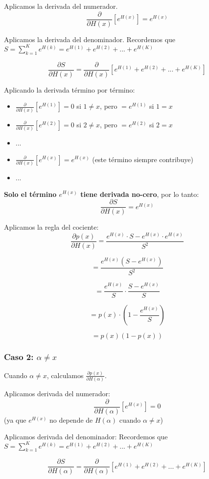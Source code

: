 \documentclass[12pt,a4paper]{article}
\begin{document}
Aplicamos la derivada del numerador.
$$\frac{\partial}{\partial H(x)}[e^{H(x)}] = e^{H(x)}$$

Aplicamos la derivada del denominador. Recordemos que $S = \sum_{k=1}^{K} e^{H(k)} = e^{H(1)} + e^{H(2)} + ... + e^{H(K)}$

$$\frac{\partial S}{\partial H(x)} = \frac{\partial}{\partial H(x)}\left[e^{H(1)} + e^{H(2)} + ... + e^{H(K)}\right]$$

Aplicando la derivada término por término:
\begin{itemize}
    \item $\frac{\partial}{\partial H(x)}[e^{H(1)}] = 0$ si $1 \neq x$, pero $= e^{H(1)}$ si $1 = x$
    \item $\frac{\partial}{\partial H(x)}[e^{H(2)}] = 0$ si $2 \neq x$, pero $= e^{H(2)}$ si $2 = x$
    \item ...
    \item $\frac{\partial}{\partial H(x)}[e^{H(x)}] = e^{H(x)}$ (este término siempre contribuye)
    \item ...
\end{itemize}

\textbf{Solo el término $e^{H(x)}$ tiene derivada no-cero}, por lo tanto:
$$\frac{\partial S}{\partial H(x)} = e^{H(x)}$$

Aplicamos la regla del cociente:
$$\frac{\partial p(x)}{\partial H(x)} = \frac{e^{H(x)} \cdot S - e^{H(x)} \cdot e^{H(x)}}{S^2}$$

$$= \frac{e^{H(x)}(S - e^{H(x)})}{S^2}$$

$$= \frac{e^{H(x)}}{S} \cdot \frac{S - e^{H(x)}}{S}$$

$$= p(x) \cdot \left(1 - \frac{e^{H(x)}}{S}\right)$$

$$= p(x)(1 - p(x))$$

\subsubsection{Caso 2: $\alpha \neq x$}

Cuando $\alpha \neq x$, calculamos $\frac{\partial p(x)}{\partial H(\alpha)}$.

Aplicamos derivada del numerador:
$$\frac{\partial}{\partial H(\alpha)}[e^{H(x)}] = 0$$
(ya que $e^{H(x)}$ no depende de $H(\alpha)$ cuando $\alpha \neq x$)

Aplicamos derivada del denominador:
Recordemos que $S = \sum_{k=1}^{K} e^{H(k)} = e^{H(1)} + e^{H(2)} + ... + e^{H(K)}$

$$\frac{\partial S}{\partial H(\alpha)} = \frac{\partial}{\partial H(\alpha)}\left[e^{H(1)} + e^{H(2)} + ... + e^{H(K)}\right]$$
\end{document}
